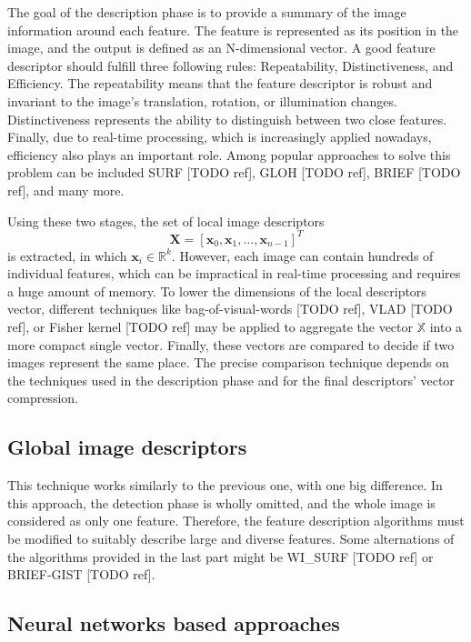 The goal of the description phase is to provide a summary of the image information around each feature. The feature is represented as its position in the image, and the output is defined as an N-dimensional vector. A good feature descriptor should fulfill three following rules: Repeatability, Distinctiveness, and Efficiency. The repeatability means that the feature descriptor is robust and invariant to the image's translation, rotation, or illumination changes. Distinctiveness represents the ability to distinguish between two close features. Finally, due to real-time processing, which is increasingly applied nowadays, efficiency also plays an important role. Among popular approaches to solve this problem can be included SURF [TODO ref], GLOH [TODO ref], BRIEF [TODO ref], and many more.\par
Using these two stages, the set of local image descriptors
$$
    \mathbf{X} = [\mathbf{x}_0, \mathbf{x}_1, \dots, \mathbf{x}_{n-1}]^T
$$
is extracted, in which $\textbf{x}_i \in \mathbb{R}^k$. However, each image can contain hundreds of individual features, which can be impractical in real-time processing and requires a huge amount of memory. To lower the dimensions of the local descriptors vector, different techniques like bag-of-visual-words [TODO ref], VLAD [TODO ref], or Fisher kernel [TODO ref] may be applied to aggregate the vector $\mathbb{X}$ into a more compact single vector. Finally, these vectors are compared to decide if two images represent the same place. The precise comparison technique depends on the techniques used in the description phase and for the final descriptors' vector compression.

\subsection{Global image descriptors}

This technique works similarly to the previous one, with one big difference. In this approach, the detection phase is wholly omitted, and the whole image is considered as only one feature. Therefore, the feature description algorithms must be modified to suitably describe large and diverse features. Some alternations of the algorithms provided in the last part might be WI\_SURF [TODO ref] or BRIEF-GIST [TODO ref].

\subsection{Neural networks based approaches}

